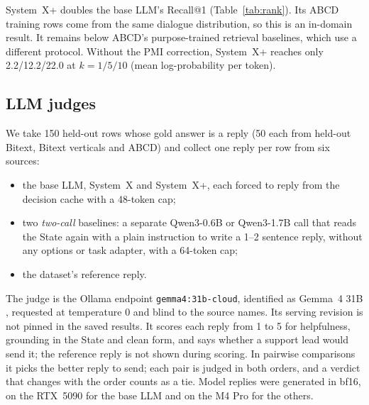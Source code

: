 \documentclass[11pt]{article}
\newcommand{\sysplus}{System~X+}
\begin{document}
\sysplus{} doubles the base LLM's Recall@1 (Table~\ref{tab:rank}). Its ABCD training rows come from the same dialogue distribution, so this is an in-domain result. It remains below ABCD's purpose-trained retrieval baselines, which use a different protocol. Without the PMI correction, \sysplus{} reaches only 2.2/12.2/22.0 at $k=1/5/10$ (mean log-probability per token).

\subsection{LLM judges}
We take 150 held-out rows whose gold answer is a reply (50 each from held-out Bitext, Bitext verticals and ABCD) and collect one reply per row from six sources:
\begin{itemize}
\item the base LLM, System~X and \sysplus{}, each forced to reply from the decision cache with a 48-token cap;
\item two \emph{two-call} baselines: a separate Qwen3-0.6B or Qwen3-1.7B call that reads the State again with a plain instruction to write a 1--2 sentence reply, without any options or task adapter, with a 64-token cap;
\item the dataset's reference reply.
\end{itemize}
The judge is the Ollama endpoint \texttt{gemma4:31b-cloud}, identified as Gemma~4 31B \citep{gemma4}, requested at temperature 0 and blind to the source names. Its serving revision is not pinned in the saved results. It scores each reply from 1 to 5 for helpfulness, grounding in the State and clean form, and says whether a support lead would send it; the reference reply is not shown during scoring. In pairwise comparisons it picks the better reply to send; each pair is judged in both orders, and a verdict that changes with the order counts as a tie. Model replies were generated in bf16, on the RTX~5090 for the base LLM and on the M4 Pro for the others.
\end{document}
